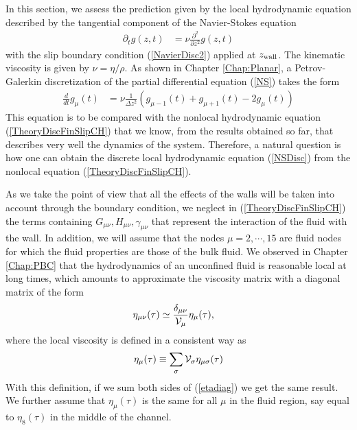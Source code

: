 \documentclass[b5paper,openright,10pt]{book}
\begin{document}
In  this  section,  we  assess  the  prediction  given  by  the  local
hydrodynamic  equation described  by the  tangential component  of the
Navier-Stokes equation
\begin{align}
  \partial_t g(z,t)&=\nu\frac{\partial^2}{\partial z^2} g(z,t)
\label{NS}
\end{align}
with  the  slip  boundary  condition  (\ref{NavierDisc2})  applied  at
$z_{\rm    wall}$.    The    kinematic   viscosity    is   given    by
$\nu=\eta/\rho$. As  shown in Chapter \ref{Chap:Planar}, a  Petrov-Galerkin discretization of
the partial differential equation (\ref{NS}) takes the form
\begin{align}
  \frac{d}{dt}g_\mu(t)&=\nu \frac{1}{\Delta z^2}(g_{\mu-1}(t)+g_{\mu+1}(t)-2g_{\mu}(t))
\label{NSDisc}
\end{align}
This  equation  is to  be  compared  with the  nonlocal  hydrodynamic
equation (\ref{TheoryDiscFinSlipCH}) that we know, from the results obtained
so   far,   that   describes   very   well   the   dynamics   of   the
system.  Therefore, a  natural  question  is how  one  can obtain  the
discrete local hydrodynamic equation (\ref{NSDisc}) from the nonlocal
equation (\ref{TheoryDiscFinSlipCH}).

As we take the point of view that all the effects of the walls will be taken
into account through the boundary  condition, we neglect in
(\ref{TheoryDiscFinSlipCH})          the           terms          containing
$G_{\mu\nu},H_{\mu\nu},\gamma_{\mu\nu}$ that represent the interaction
of the  fluid with  the wall. In addition, we will assume that
 the  nodes
$\mu=2,\cdots,15$   are   fluid   nodes for which the fluid properties are those
of the bulk fluid.
We observed in Chapter \ref{Chap:PBC}
that the hydrodynamics  of an unconfined fluid is  reasonable local at
long times, which  amounts to approximate the viscosity  matrix with a
diagonal matrix of the form
\begin{align}
  \eta_{\mu\nu}(\tau)&\simeq\frac{\delta_{\mu\nu}}{{\cal V}_\mu}\eta_\mu(\tau),
\label{etadiag}
\end{align}
where the local viscosity is defined in a consistent way as
\begin{align}
\eta_\mu(\tau)\equiv\sum_\sigma{\cal V}_\sigma \eta_{\mu\sigma}(\tau)
\label{LocVisc}
\end{align}
With this definition, if we sum both sides of (\ref{etadiag}) we get the same result.
We further assume that $\eta_\mu(\tau)$ is the same for all $\mu$ in the fluid region,
say equal to $\eta_{8}(\tau)$ in the middle of the channel.
\end{document}
